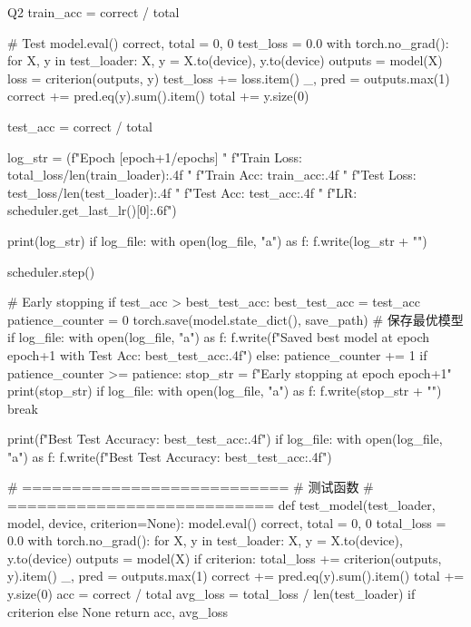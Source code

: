 \begin{Python}{Q2}
        train_acc = correct / total

        # Test
        model.eval()
        correct, total = 0, 0
        test_loss = 0.0
        with torch.no_grad():
            for X, y in test_loader:
                X, y = X.to(device), y.to(device)
                outputs = model(X)
                loss = criterion(outputs, y)
                test_loss += loss.item()
                _, pred = outputs.max(1)
                correct += pred.eq(y).sum().item()
                total += y.size(0)

        test_acc = correct / total

        log_str = (f"Epoch [{epoch+1}/{epochs}] "
                   f"Train Loss: {total_loss/len(train_loader):.4f} "
                   f"Train Acc: {train_acc:.4f} "
                   f"Test Loss: {test_loss/len(test_loader):.4f} "
                   f"Test Acc: {test_acc:.4f} "
                   f"LR: {scheduler.get_last_lr()[0]:.6f}")

        print(log_str)
        if log_file:
            with open(log_file, "a") as f:
                f.write(log_str + "\n")

        scheduler.step()

        # Early stopping
        if test_acc > best_test_acc:
            best_test_acc = test_acc
            patience_counter = 0
            torch.save(model.state_dict(), save_path)  # 保存最优模型
            if log_file:
                with open(log_file, "a") as f:
                    f.write(f"Saved best model at epoch {epoch+1} with Test Acc: {best_test_acc:.4f}\n")
        else:
            patience_counter += 1
            if patience_counter >= patience:
                stop_str = f"Early stopping at epoch {epoch+1}"
                print(stop_str)
                if log_file:
                    with open(log_file, "a") as f:
                        f.write(stop_str + "\n")
                break

    print(f"Best Test Accuracy: {best_test_acc:.4f}")
    if log_file:
        with open(log_file, "a") as f:
            f.write(f"Best Test Accuracy: {best_test_acc:.4f}\n")



# ===========================
# 测试函数
# ===========================
def test_model(test_loader, model, device, criterion=None):
    model.eval()
    correct, total = 0, 0
    total_loss = 0.0
    with torch.no_grad():
        for X, y in test_loader:
            X, y = X.to(device), y.to(device)
            outputs = model(X)
            if criterion:
                total_loss += criterion(outputs, y).item()
            _, pred = outputs.max(1)
            correct += pred.eq(y).sum().item()
            total += y.size(0)
    acc = correct / total
    avg_loss = total_loss / len(test_loader) if criterion else None
    return acc, avg_loss

\end{Python}

